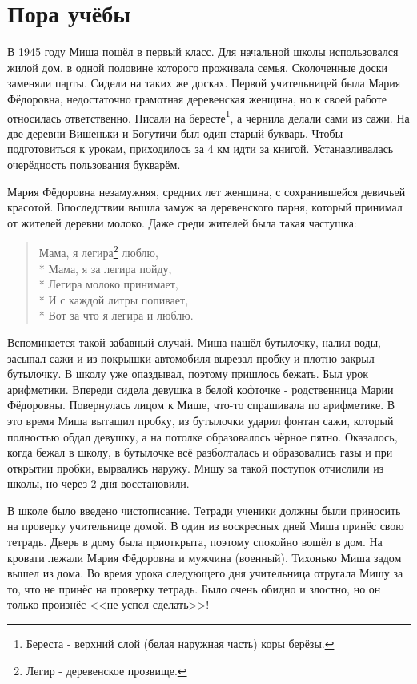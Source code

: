 ﻿\chapter{Пора учёбы}
В 1945 году Миша пошёл в первый класс. Для начальной школы использовался жилой дом, в одной половине которого проживала семья. Сколоченные доски заменяли парты. Сидели на таких же досках. Первой учительницей была Мария Фёдоровна, недостаточно грамотная деревенская женщина, но к своей работе относилась ответственно. Писали на бересте\footnote{Береста - верхний слой (белая наружная часть) коры берёзы.}, а чернила делали сами из сажи. На две деревни Вишеньки и Богутичи был один старый букварь. Чтобы подготовиться к урокам, приходилось за 4 км идти за книгой. Устанавливалась очерёдность пользования букварём.

Мария Фёдоровна незамужняя, средних лет женщина, с сохранившейся девичьей красотой. Впоследствии вышла замуж за деревенского парня, который принимал от жителей деревни молоко. Даже среди жителей была такая частушка:

\begin{verse}
	Мама, я легира\footnote{Легир - деревенское прозвище.} люблю, \\* 
	Мама, я за легира пойду, \\*	
	Легира молоко принимает, \\*
	И с каждой литры попивает, \\*
	Вот за что я легира и люблю. 
\end{verse}

Вспоминается такой забавный случай. Миша нашёл бутылочку, налил воды, засыпал сажи и из покрышки автомобиля вырезал пробку и плотно закрыл бутылочку. В школу уже опаздывал, поэтому пришлось бежать. Был урок арифметики. Впереди сидела девушка в белой кофточке - родственница Марии Фёдоровны. Повернулась лицом к Мише, что-то спрашивала по арифметике. В это время Миша вытащил пробку, из бутылочки ударил фонтан сажи, который полностью обдал девушку, а на потолке образовалось чёрное пятно. Оказалось, когда бежал в школу, в бутылочке всё разболталась и образовались газы и при открытии пробки, вырвались наружу. Мишу за такой поступок отчислили из школы, но через 2 дня восстановили.

В школе было введено чистописание. Тетради ученики должны были приносить на проверку учительнице домой. В один из воскресных дней Миша принёс свою тетрадь. Дверь в дому была приоткрыта, поэтому спокойно вошёл в дом. На кровати лежали Мария Фёдоровна и мужчина (военный). Тихонько Миша задом вышел из дома. Во время урока следующего дня учительница отругала Мишу за то, что не принёс на проверку тетрадь. Было очень обидно и злостно, но он только произнёс <<не успел сделать>>! 

